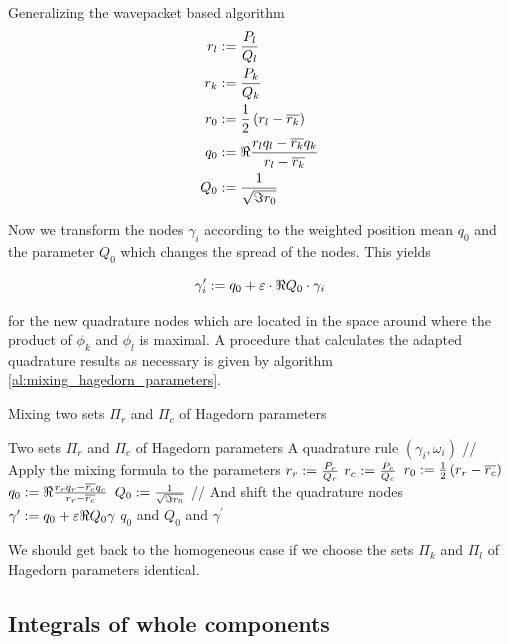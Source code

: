 \begin{chapter}{Generalizing the wavepacket based algorithm}
\begin{equation}
\begin{split}
  r_l & := \frac{P_l}{Q_l} \\
  r_k & := \frac{P_k}{Q_k} \\
  r_0 & := \frac{1}{2} \left(r_l - \overline{r_k}\right) \\
  q_0 & := \Re \frac{r_l q_l - \overline{r_k} q_k}{r_l - \overline{r_k}} \\
  Q_0 & := \frac{1}{\sqrt{\Im r_0}}
\end{split}
\end{equation}

Now we transform the nodes $\gamma_i$ according to the weighted position mean $q_0$
and the parameter $Q_0$ which changes the spread of the nodes. This yields

\begin{equation}
  \gamma^{\prime}_i := q_0 + \varepsilon \cdot \Re Q_0 \cdot \gamma_i
\end{equation}

for the new quadrature nodes which are located in the space around where
the product of $\phi_k$ and $\phi_l$ is maximal. A procedure that calculates
the adapted quadrature results as necessary is given by algorithm \ref{al:mixing_hagedorn_parameters}.

\begin{algorithm}
\caption{Mixing two sets $\Pi_r$ and $\Pi_c$ of Hagedorn parameters}
\label{al:mixing_hagedorn_parameters}
\begin{algorithmic}
  \REQUIRE Two sets $\Pi_r$ and $\Pi_c$ of Hagedorn parameters
  \REQUIRE A quadrature rule $\left(\gamma_i, \omega_i\right)$
  \STATE // Apply the mixing formula to the parameters
  \STATE $r_r := \frac{P_r}{Q_r}$
  \STATE $r_c := \frac{P_c}{Q_c}$
  \STATE $r_0 := \frac{1}{2}\left(r_r - \overline{r_c}\right)$
  \STATE $q_0 := \Re \frac{r_r q_r - \overline{r_c} q_c}{r_r - \overline{r_c}}$
  \STATE $Q_0 := \frac{1}{\sqrt{\Im r_0}}$
  \STATE // And shift the quadrature nodes
  \STATE $\gamma^\prime := q_0 + \varepsilon \Re Q_0 \gamma$
  \RETURN $q_0$ and $Q_0$ and $\gamma^\prime$
\end{algorithmic}
\end{algorithm}

We should get back to the homogeneous case if we choose the sets $\Pi_k$ and
$\Pi_l$ of Hagedorn parameters identical.

\subsection{Integrals of whole components}


\end{chapter}
